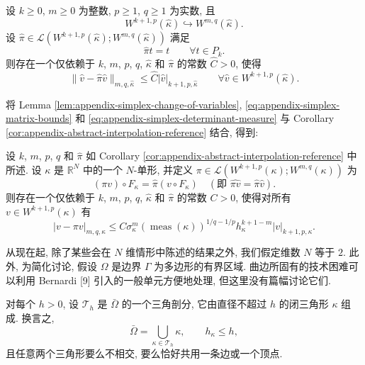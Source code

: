 \setcounter{statement}{0}
\begin{Corollary}\label{cor:appendix-abstract-interpolation-reference}
设 $k\geq0$, $m\geq0$ 为整数, $p\geq1$, $q\geq1$ 为实数, 且
\[
W^{k+1,p}(\hat\kappa)\hookrightarrow W^{m,q}(\hat\kappa).
\]
设
$\hat\pi\in\mathcal{L}(W^{k+1,p}(\hat\kappa);W^{m,q}(\hat\kappa))$
满足
\[
\hat\pi t=t
\qquad
\forall t\in P_k.
\]
则存在一个仅依赖于 $k$, $m$, $p$, $q$, $\hat\kappa$ 和 $\hat\pi$
的常数 $\hat C>0$, 使得
\begin{equation}\label{eq:appendix-abstract-interpolation-reference}
\|\hat v-\hat\pi\hat v\|_{m,q,\hat\kappa}
\leq
\hat C|\hat v|_{k+1,p,\hat\kappa}
\qquad
\forall\hat v\in W^{k+1,p}(\hat\kappa).
\end{equation}
\end{Corollary}

将 Lemma \ref{lem:appendix-simplex-change-of-variables},
\eqref{eq:appendix-simplex-matrix-bounds} 和
\eqref{eq:appendix-simplex-determinant-measure}
与 Corollary \ref{cor:appendix-abstract-interpolation-reference} 结合, 得到:

\setcounter{statement}{1}
\begin{Corollary}\label{cor:appendix-abstract-interpolation-physical}
设 $k$, $m$, $p$, $q$ 和 $\hat\pi$ 如 Corollary
\ref{cor:appendix-abstract-interpolation-reference} 中所述.
设 $\kappa$ 是 $\mathbb{R}^N$ 中的一个 $N$-单形, 并定义
$\pi\in\mathcal{L}(W^{k+1,p}(\kappa);W^{m,q}(\kappa))$ 为
\begin{equation}\label{eq:appendix-interpolant-commuting-definition}
(\pi v)\circ F_\kappa
=
\hat\pi(v\circ F_\kappa)
\quad
(\text{即 }\widehat{\pi v}=\hat\pi\hat v).
\end{equation}
则存在一个仅依赖于 $k$, $m$, $p$, $q$, $\hat\kappa$ 和 $\hat\pi$
的常数 $C>0$, 使得对所有 $v\in W^{k+1,p}(\kappa)$ 有
\begin{equation}\label{eq:appendix-abstract-interpolation-physical}
|v-\pi v|_{m,q,\kappa}
\leq
C\sigma_\kappa^m
(\operatorname{meas}(\kappa))^{1/q-1/p}
h_\kappa^{k+1-m}
|v|_{k+1,p,\kappa}.
\end{equation}
\end{Corollary}

从现在起, 除了某些会在 $N$ 维情形中陈述的结果之外,
我们假定维数 $N$ 等于 $2$.
此外, 为简化讨论, 假设 $\Omega$ 是边界 $\Gamma$ 为多边形的有界区域.
曲边所固有的技术困难可以利用 Bernardi [9] 引入的一般单元方便地处理,
但这里没有篇幅讨论它们.

对每个 $h>0$, 设 $\mathcal{T}_h$ 是 $\bar\Omega$ 的一个三角剖分,
它由直径不超过 $h$ 的闭三角形 $\kappa$ 组成. 换言之,
\[
\bar\Omega
=
\bigcup_{\kappa\in\mathcal{T}_h}\kappa,
\qquad
h_\kappa\leq h,
\]
且任意两个三角形要么不相交, 要么恰好共用一条边或一个顶点.

